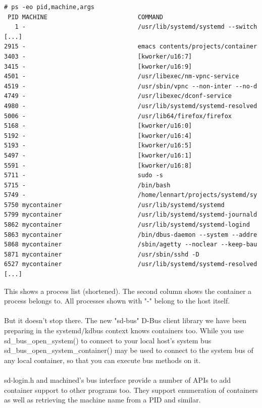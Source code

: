\documentclass[titlepage]{article}
\begin{document}
\begin{lstlisting}
# ps -eo pid,machine,args
 PID MACHINE                         COMMAND
   1 -                               /usr/lib/systemd/systemd --switch
[...]
2915 -                               emacs contents/projects/container
3403 -                               [kworker/u16:7]
3415 -                               [kworker/u16:9]
4501 -                               /usr/libexec/nm-vpnc-service
4519 -                               /usr/sbin/vpnc --non-inter --no-d
4749 -                               /usr/libexec/dconf-service
4980 -                               /usr/lib/systemd/systemd-resolved
5006 -                               /usr/lib64/firefox/firefox
5168 -                               [kworker/u16:0]
5192 -                               [kworker/u16:4]
5193 -                               [kworker/u16:5]
5497 -                               [kworker/u16:1]
5591 -                               [kworker/u16:8]
5711 -                               sudo -s
5715 -                               /bin/bash
5749 -                               /home/lennart/projects/systemd/sy
5750 mycontainer                     /usr/lib/systemd/systemd
5799 mycontainer                     /usr/lib/systemd/systemd-journald
5862 mycontainer                     /usr/lib/systemd/systemd-logind
5863 mycontainer                     /bin/dbus-daemon --system --addre
5868 mycontainer                     /sbin/agetty --noclear --keep-bau
5871 mycontainer                     /usr/sbin/sshd -D
6527 mycontainer                     /usr/lib/systemd/systemd-resolved
[...]
\end{lstlisting}
This shows a process list (shortened). The second column shows the container a process belongs to. All processes shown with "-" belong to the host itself.
\\
\\
But it doesn't stop there. The new "sd-bus" D-Bus client library we have been preparing in the systemd/kdbus context knows containers too. While you use sd\_bus\_open\_system() to connect to your local host's system bus sd\_bus\_open\_system\_container() may be used to connect to the system bus of any local container, so that you can execute bus methods on it.
\\
\\
sd-login.h and machined's bus interface provide a number of APIs to add container support to other programs too. They support enumeration of containers as well as retrieving the machine name from a PID and similar.
\\
\end{document}

